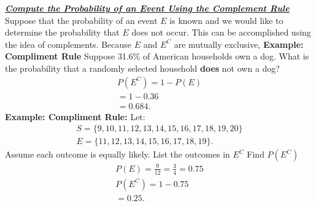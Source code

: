 \documentclass{report}
\begin{document}
    \pagebreak \bigbreak \noindent
    \textbf{\textit{\underline{Compute the Probability of an Event Using the Complement Rule}}}
    \bigbreak \noindent 
    Suppose that the probability of an event $E $ is known and we would like to determine the probability that $E $ does not occur. This can be accomplished using the idea of complements.
    \bigbreak \noindent 
    Because $E$ and $E^{C}$ are mutually exclusive,
    \bigbreak \noindent 
      \textbf{Example: Compliment Rule}
      \bigbreak \noindent 
      Suppose 31.6\% of American households own a dog. What is the probability that a randomly selected household \textbf{does} not own a dog?
      \begin{align*}
          P(E^{C}) = 1 - P(E) \\
          = 1- 0.36 \\
          =0.684
      .\end{align*}
    \bigbreak \noindent 
      \textbf{Example: Compliment Rule:}
      \bigbreak \noindent 
      Let:
      \begin{align*}
          S=\{9,10,11,12,13,14,15,16,17,18,19,20\} \\
          E=\{11,12,13,14,15,16,17,18,19\}
      .\end{align*}
      Assume each outcome is equally likely. List the outcomes in $E^{C} $ Find $P(E^{C})$
      \begin{align*}
          P(E) = \frac{9}{12} = \frac{3}{4} = 0.75 \\
          P(E^{C}) =1- 0.75 \\
          = 0.25
      .\end{align*}

    \pagebreak \bigbreak \noindent
\end{document}
